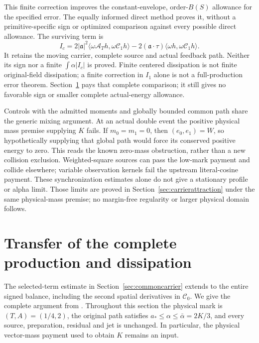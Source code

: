 \documentclass[11pt]{article}
\numberwithin{equation}{section}
\begin{document}
This finite correction improves the constant-envelope, order-$B(S)$
allowance for the specified error. The equally informed direct method
proves it, without a primitive-specific sign or optimized comparison
against every possible direct allowance. The surviving term is
\begin{equation}\label{eq:survivingcarrierproduction}
 I_c=2|\mathfrak a|^2
       \langle\omega\mathcal A_Th,\omega\mathscr C_1h\rangle
       -2(\mathfrak a\cdot\tau)
       \langle\omega h,\omega\mathscr C_1h\rangle.
\end{equation}
It retains the moving carrier, complete source and actual feedback path.
Neither its sign nor a finite $\int\alpha|I_c|$ is proved.
Finite centered dissipation is not finite original-field dissipation;
a finite correction in $I_1$ alone is not a full-production error theorem.
Section~\ref{sec:fullcarriertransfer} pays that complete comparison; it
still gives no favorable sign or smaller complete actual-energy allowance.

Controls with the admitted moments and globally bounded common path
share the generic mixing argument. At an actual double event the
positive physical mass premise supplying $K$ fails. If $m_0=m_1=0$,
then $(e_0,e_1)=W$, so hypothetically supplying that global path would
force its conserved positive energy to zero. This reads the known
zero-mass obstruction, rather than a new collision exclusion.
Weighted-square sources can pass the low-mark payment and collide
elsewhere; variable observation kernels fail the upstream literal-cosine
payment. These synchronization estimates alone do not give a stationary profile
or alpha limit. Those limits are proved in Section~\ref{sec:carrierattraction}
under the same physical-mass premise; no margin-free regularity or larger
physical domain follows.

\section{Transfer of the complete production and dissipation}
\label{sec:fullcarriertransfer}

The selected-term estimate in Section~\ref{sec:commoncarrier} extends
to the entire signed balance, including the second spatial derivatives
in $\mathscr C_0$. We give the complete argument from
\cite{FullCarrierNote}. Throughout this section the physical mark is
$(T,A)=(1/4,2)$, the original path satisfies
$a_*\le\alpha\le\bar\alpha=2K/3$, and every source, preparation,
residual and jet is unchanged. In particular, the physical vector-mass
payment used to obtain $K$ remains an input.
\end{document}
